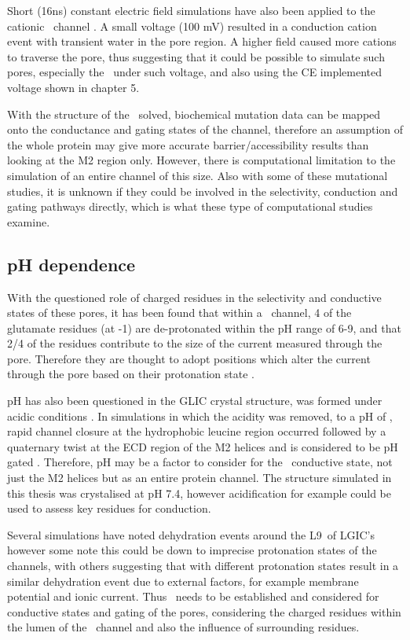 Short (16ns) constant electric field simulations have also been applied to the cationic \na\ channel \cite{Wong2008}. A small voltage (100 mV) resulted in a conduction cation event with transient water in the pore region. A higher field caused more cations to traverse the pore, thus suggesting that it could be possible to simulate such pores, especially the \HT\ under such voltage, and also using the CE implemented voltage shown in chapter 5. 

With the structure of the \HT\ solved, biochemical mutation data can be mapped onto the conductance and gating states of the channel, therefore an assumption of the whole protein may give more accurate barrier/accessibility results than looking at the M2 region only. However, there is computational limitation to the simulation of an entire channel of this size. Also with some of these mutational studies, it is unknown if they could be involved in the selectivity, conduction and gating pathways directly, which is what these type of computational studies examine. 

\subsection*{pH dependence}

With the questioned role of charged residues in the selectivity and conductive states of these pores, it has been found that within a \na\ channel, 4 of the glutamate residues (at -1\textquotesingle) are de-protonated within the pH range of 6-9, and that 2/4 of the residues contribute to the size of the current measured through the pore. Therefore they are thought to adopt positions which alter the current through the pore based on their protonation state \cite{Cymes2012}.

pH has also been questioned in the GLIC crystal structure, was formed under acidic conditions \cite{Hilf2008}. In simulations in which the acidity was removed, to a pH of , rapid channel closure at the hydrophobic leucine region occurred followed by a quaternary twist at the ECD region of the M2 helices \cite{Nury2010} and is considered to be pH gated \cite{Cheng2010a}. Therefore, pH may be a factor to consider for the \HT\ conductive state, not just the M2 helices but as an entire protein channel. The structure simulated in this thesis was crystalised at pH 7.4, however acidification for example could be used to assess key residues for conduction. 

Several simulations have noted dehydration events around the L9\textquotesingle\ of LGIC's  \cite{Murail2011,LeBard2012,Cheng2012} however some note this could be down to imprecise protonation states of the channels, with others suggesting that with different protonation states result in a similar dehydration event \cite{LeBard2012,Cheng2012,Nury2010} due to external factors, for example membrane potential and ionic current. Thus \pka\ needs to be established and considered for conductive states and gating of the pores, considering the charged residues within the lumen of the \HT\ channel and also the influence of surrounding residues. 

